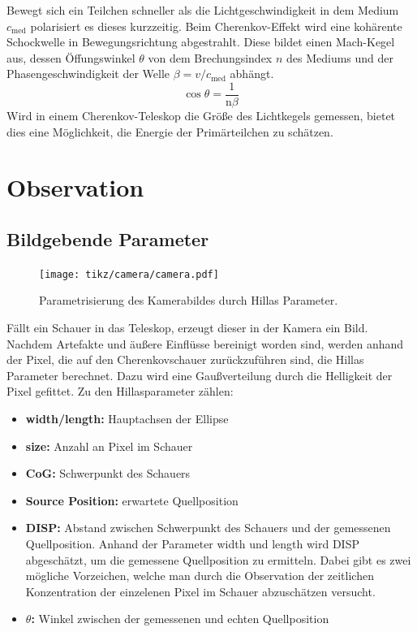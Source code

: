 Bewegt sich ein Teilchen schneller als die Lichtgeschwindigkeit in dem Medium $c_\text{med}$ polarisiert es dieses kurzzeitig. 
Beim Cherenkov-Effekt wird eine kohärente Schockwelle in Bewegungsrichtung abgestrahlt. 
Diese bildet einen Mach-Kegel aus, dessen Öffungswinkel $\theta$ von dem Brechungsindex $n$ des Mediums und der Phasengeschwindigkeit der Welle $\beta = v / c_\text{med}$ abhängt.
\begin{equation}
  \cos  \theta = \frac{1}{\text{n} \beta}
\end{equation}
Wird in einem Cherenkov-Teleskop die Größe des Lichtkegels gemessen, bietet dies eine Möglichkeit, die Energie der Primärteilchen zu schätzen. 
\chapter{Observation}
\section{Bildgebende Parameter}
\begin{figure}[H]
  \centering
  \texttt{[image: tikz/camera/camera.pdf]}
  \caption{Parametrisierung des Kamerabildes durch Hillas Parameter.}
\end{figure}
Fällt ein Schauer in das Teleskop, erzeugt dieser in der Kamera ein Bild. 
Nachdem Artefakte und äußere Einflüsse bereinigt worden sind, werden anhand der Pixel, die auf den Cherenkovschauer zurückzuführen sind, die Hillas Parameter \cite{hillas} berechnet. 
Dazu wird eine Gaußverteilung durch die Helligkeit der Pixel gefittet. 
Zu den Hillasparameter zählen:
\begin{itemize}
  \item \textbf{width/length:} Hauptachsen der Ellipse
  \item \textbf{size:} Anzahl an Pixel im Schauer
  \item \textbf{CoG:} Schwerpunkt des Schauers
  \item \textbf{Source Position:} erwartete Quellposition
  \item \textbf{DISP:} Abstand zwischen Schwerpunkt des Schauers und der gemessenen Quellposition. Anhand der Parameter width und length wird DISP abgeschätzt, um die gemessene Quellposition zu ermitteln. Dabei gibt es zwei mögliche Vorzeichen, welche man durch die Observation der zeitlichen Konzentration der einzelenen Pixel im Schauer abzuschätzen versucht.
  \item \textbf{$\theta$:} Winkel zwischen der gemessenen und echten Quellposition
\end{itemize}
